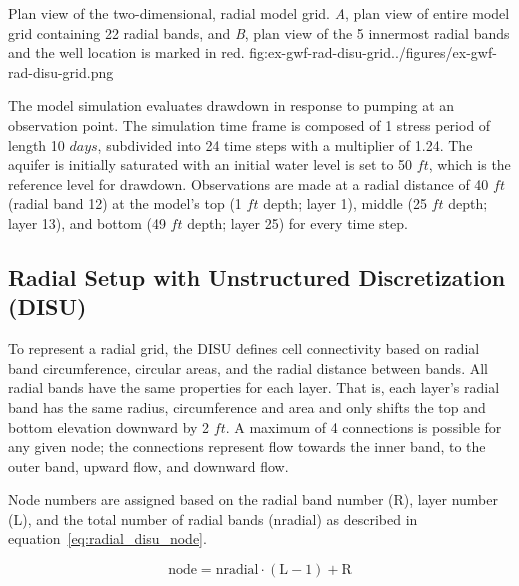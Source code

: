 \begin{StandardFigure}{
                                     Plan view of the two-dimensional, radial model grid.
                                     \textit{A}, plan view of entire model grid containing 22 radial bands, and 
                                     \textit{B}, plan view of the 5 innermost radial bands and the well location is marked in red.
                                     }{fig:ex-gwf-rad-disu-grid}{../figures/ex-gwf-rad-disu-grid.png}
\end{StandardFigure}                                 


The model simulation evaluates drawdown in response to pumping at an observation point. The simulation time frame is composed of 1 stress period of length 10 $days$, subdivided into 24 time steps with a multiplier of 1.24. The aquifer is initially saturated with an initial water level is set to 50 $ft$, which is the reference level for drawdown. Observations are made at a radial distance of 40 $ft$ (radial band 12) at the model’s top (1 $ft$ depth; layer 1), middle (25 $ft$ depth; layer 13), and bottom (49 $ft$ depth; layer 25) for every time step. 






\subsection{Radial Setup with Unstructured Discretization (DISU)}
To represent a radial grid, the DISU defines cell connectivity based on radial band circumference, circular areas, and the radial distance between bands. All radial bands have the same properties for each layer. That is, each layer’s radial band has the same radius, circumference and area and only shifts the top and bottom elevation downward by 2 $ft$. A maximum of 4 connections is possible for any given node; the connections represent flow towards the inner band, to the outer band, upward flow, and downward flow.

Node numbers are assigned based on the radial band number (R), layer number (L), and the total number of radial bands (nradial) as described in equation~\ref{eq:radial_disu_node}.

\begin{equation}
   \text{node} = \text{nradial} \cdot \left(\text{L}-1\right)+\text{R}
   \label{eq:radial_disu_node}
\end{equation}

